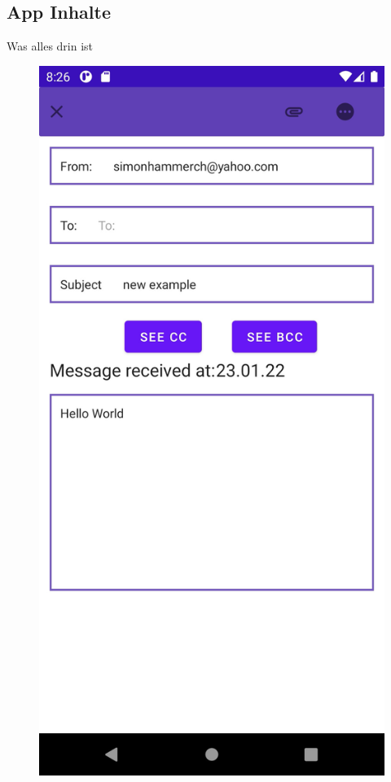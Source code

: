 \documentclass[aspectratio=169]{beamer}
\begin{document}
\subsection{App Inhalte}
\begin{frame}[plain]{Was alles drin ist}

    \begin{figure}[h]

        \includegraphics[height=.8\textheight]{media/emailViewer.jpg}

\end{figure}
\end{frame}
\end{document}
